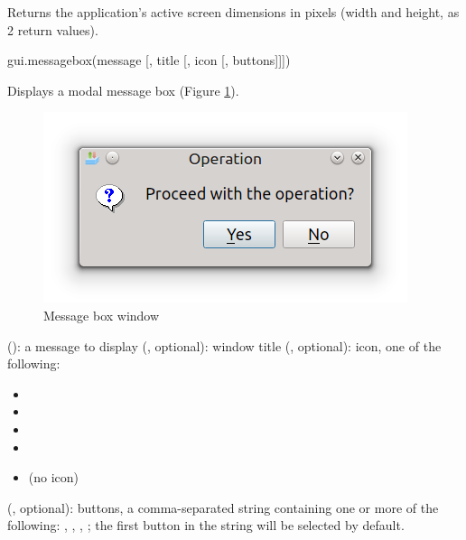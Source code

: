 \documentclass[a4paper,12pt,twoside,extrafontsizes]{memoir}
\begin{document}
\begin{funcret}
	Returns the application's active screen dimensions in pixels (width and height, as 2 return values).
\end{funcret}


\begin{luafuncprototype}
gui.messagebox(message [, title [, icon [, buttons]]])
\end{luafuncprototype}

\begin{funcdescr}
	Displays a modal message box (Figure \ref{fig:messagebox}).
\end{funcdescr}

\begin{figure}[htbp]
\centering
\includegraphics{images/messagebox.png}
\caption{Message box window}
\label{fig:messagebox}
\end{figure}

\begin{funcparams}
	 (): a message to display
	 (, optional): window title
	 (, optional): icon, one of the following:
	\begin{itemize}
		\item {}
		\item {}
		\item {}
		\item {}
		\item {} (no icon)
	\end{itemize}
	 (, optional): buttons, a comma-separated string containing one or more of the following: , , , ; the first button in the string will be selected by default.
\end{funcparams}
\end{document}
